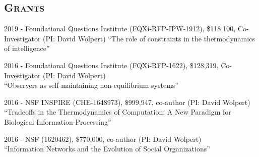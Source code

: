 \documentclass[margin,line,centered]{res}
\begin{document}
\begin{resume}








\section{\textsc{Grants}}
2019 - Foundational Questions Institute (FQXi-RFP-IPW-1912),  \$118,100, Co-Investigator (PI: David Wolpert)
``The role of constraints in the thermodynamics of intelligence'' 

2016 - Foundational Questions Institute (FQXi-RFP-1622), \$128,319, Co-Investigator (PI: David Wolpert)\\
``Observers as self-maintaining non-equilibrium systems''

2016 - NSF INSPIRE (CHE-1648973), \$999,947, co-author (PI: David Wolpert)\\
``Tradeoffs in the Thermodynamics of Computation: A New Paradigm for Biological Information-Processing''

2016 - NSF (1620462), \$770,000, co-author (PI: David Wolpert)\\
``Information Networks and the Evolution of Social Organizations'' 




\end{resume}
\end{document}
